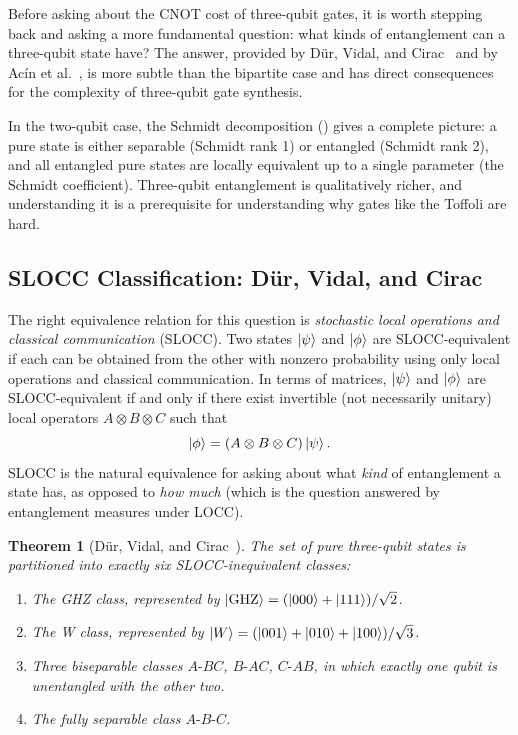 \documentclass[12pt, a4paper, oneside]{report}
\theoremstyle{plain}
\newtheorem{theorem}{Theorem}[chapter]
\theoremstyle{definition}
\theoremstyle{remark}
\begin{document}
Before asking about the CNOT cost of three-qubit gates, it is worth stepping back and asking
a more fundamental question: what kinds of entanglement can a three-qubit state have? The
answer, provided by Dür, Vidal, and Cirac~\cite{dur2000} and by Acín et al.~\cite{acin2000},
is more subtle than the bipartite case and has direct consequences for the complexity of
three-qubit gate synthesis.

In the two-qubit case, the Schmidt decomposition () gives a complete
picture: a pure state is either separable (Schmidt rank 1) or entangled (Schmidt rank 2),
and all entangled pure states are locally equivalent up to a single parameter (the Schmidt
coefficient). Three-qubit entanglement is qualitatively richer, and understanding it is a
prerequisite for understanding why gates like the Toffoli are hard.

\subsection{SLOCC Classification: Dür, Vidal, and Cirac}

The right equivalence relation for this question is \emph{stochastic local operations and
classical communication} (SLOCC). Two states $\ket{\psi}$ and $\ket{\phi}$ are
SLOCC-equivalent if each can be obtained from the other with nonzero probability using only
local operations and classical communication. In terms of matrices, $\ket{\psi}$ and
$\ket{\phi}$ are SLOCC-equivalent if and only if there exist invertible (not necessarily
unitary) local operators $A \otimes B \otimes C$ such that
\[
  \ket{\phi} = (A \otimes B \otimes C)\ket{\psi}.
\]
SLOCC is the natural equivalence for asking about what \emph{kind} of entanglement a state
has, as opposed to \emph{how much} (which is the question answered by entanglement measures
under LOCC).

\begin{theorem}[Dür, Vidal, and Cirac~\cite{dur2000}]
\label{thm:dur-vidal-cirac}
The set of pure three-qubit states is partitioned into exactly six SLOCC-inequivalent
classes:
\begin{enumerate}
  \item The \emph{GHZ class}, represented by $\ket{\mathrm{GHZ}} = (\ket{000}+\ket{111})/\sqrt{2}$.
  \item The \emph{W class}, represented by $\ket{W} = (\ket{001}+\ket{010}+\ket{100})/\sqrt{3}$.
  \item Three \emph{biseparable classes} $A\text{-}BC$, $B\text{-}AC$, $C\text{-}AB$,
        in which exactly one qubit is unentangled with the other two.
  \item The \emph{fully separable class} $A\text{-}B\text{-}C$.
\end{enumerate}
\end{theorem}
\end{document}
